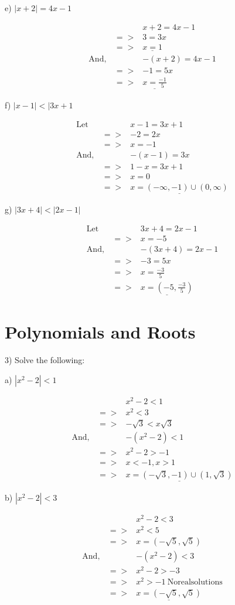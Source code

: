 \documentclass[11pt]{article}
\begin{document}
\begin{flushleft} e) $\displaystyle{|x+2|=4x-1} $ \end{flushleft}
\begin{eqnarray*}
&&x+2=4x-1\\
&=>&3=3x\\
&=>&\underline{x=1}\\
\mathrm{And, }&&-(x+2)=4x-1\\
&=>&-1=5x\\
&=>&\underline{x=\frac{-1}{5}}
\end{eqnarray*}

\begin{flushleft} f) $\displaystyle{|x-1|<|3x+1} $ \end{flushleft}
\begin{eqnarray*}
\mathrm{Let}&&x-1=3x+1\\
&=>&-2=2x\\
&=>&x=-1\\
\mathrm{And, }&&-(x-1)=3x\\
&=>&1-x=3x+1\\
&=>&x=0\\
&=>&\underline{x=(-\infty,-1)\cup(0,\infty)}
\end{eqnarray*}

\begin{flushleft} g) $\displaystyle{|3x+4|<|2x-1|} $ \end{flushleft}
\begin{eqnarray*}
\mathrm{Let}&&3x+4=2x-1\\
&=>&x=-5\\
\mathrm{And, }&&-(3x+4)=2x-1\\
&=>&-3=5x\\
&=>&x=\frac{-3}{5}\\
&=>&\underline{x=(-5,\frac{-3}{5})}
\end{eqnarray*}

\section{Polynomials and Roots}
\begin{flushleft} 3) Solve the following:\end{flushleft}

\begin{flushleft} a) $\displaystyle{|x^2-2|<1} $ \end{flushleft}
\begin{eqnarray*}
&&x^2-2<1\\
&=>&x^2<3\\
&=>&-\sqrt{3}<x\sqrt{3}\\
\mathrm{And, }&&-(x^2-2)<1\\
&=>&x^2-2>-1\\
&=>&x<-1,x>1\\
&=>&\underline{x=(-\sqrt{3},-1)\cup(1,\sqrt{3})}
\end{eqnarray*}

\begin{flushleft} b) $\displaystyle{|x^2-2|<3} $ \end{flushleft}
\begin{eqnarray*}
&&x^2-2<3\\
&=>&x^2<5\\
&=>&x=(-\sqrt{5},\sqrt{5})\\
\mathrm{And, }&&-(x^2-2)<3\\
&=>&x^2-2>-3\\
&=>&x^2>-1\ \mathrm{No real solutions}\\
&=>&\underline{x=(-\sqrt{5},\sqrt{5})}
\end{eqnarray*}
\end{document}
